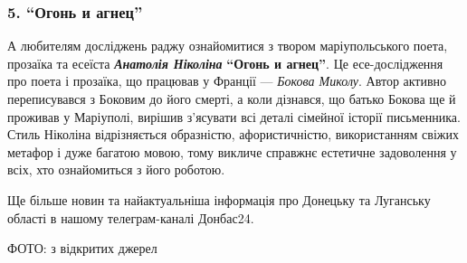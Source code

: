 \subsubsection{5. \enquote{Огонь и агнец}}


А любителям досліджень раджу ознайомитися з твором маріупольського поета,
прозаїка та есеїста \textbf{\emph{Анатолія Ніколіна}} \textbf{\enquote{Огонь и агнец}}.
Це есе-дослідження про поета і прозаїка, що працював у Франції — \emph{Бокова
Миколу}. Автор активно переписувався з Боковим до його смерті, а коли дізнався,
що батько Бокова ще й проживав у Маріуполі, вирішив з'ясувати всі деталі
сімейної історії письменника. Стиль Ніколіна відрізняється образністю,
афористичністю, використанням свіжих метафор і дуже багатою мовою, тому викличе
справжнє естетичне задоволення у всіх, хто ознайомиться з його роботою.


Ще більше новин та найактуальніша інформація про Донецьку та Луганську області
в нашому телеграм-каналі Донбас24.

ФОТО: з відкритих джерел

